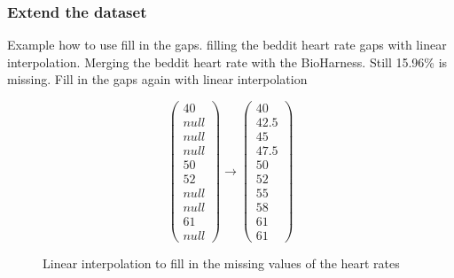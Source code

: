 		\subsubsection{Extend the dataset}
			Example how to use fill in the gaps.
			filling the beddit heart rate gaps with linear interpolation.
			Merging the beddit heart rate with the BioHarness. 
			Still 15.96\% is missing. 
			Fill in the gaps again with linear interpolation
			\begin{figure}[h!]
			\[ 
				\left(
				\begin{array}{c}
				40 \\
				null \\
				null \\
				null \\
				50 \\
				52 \\
				null \\
				null \\
				61 \\
				null
				\end{array}
				\right)
				\to
				\left(
				\begin{array}{c}
				40 \\
				42.5 \\
				45 \\
				47.5 \\
				50 \\
				52 \\
				55 \\
				58 \\
				61 \\
				61
				\end{array}
				\right)
			\] 
			\caption{Linear interpolation to fill in the missing values of the heart rates}
		\end{figure}
		
